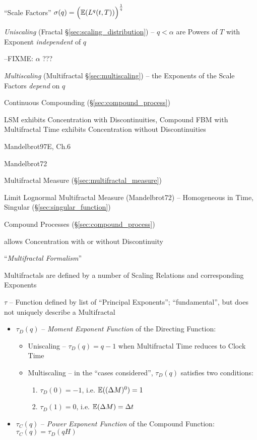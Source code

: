 ``Scale Factors'' $\sigma(q) = \Big(\mathbb{E}(L^q(t, T))\Big)^{\frac{1}{q}}$

\emph{Uniscaling} (Fractal \S\ref{sec:scaling_distribution}) -- $q < \alpha$ are
Powers of $T$ with Exponent \emph{independent} of $q$

--FIXME: $\alpha$ ???

\emph{Multiscaling} (Multifractal \S\ref{sec:multiscaling}) -- the Exponents of
the Scale Factors \emph{depend} on $q$

Continuous Compounding (\S\ref{sec:compound_process})

LSM exhibits Concentration with Discontinuities, Compound FBM with Multifractal
Time exhibits Concentration without Discontinuities

Mandelbrot97E, Ch.6

Mandelbrot72

Multifractal Measure (\S\ref{sec:multifractal_measure})

Limit Lognormal Multifractal Measure (Mandelbrot72) -- Homogeneous in Time,
Singular (\S\ref{sec:singular_function})

Compound Processes (\S\ref{sec:compound_process})

allows Concentration with or without Discontinuity

``\emph{Multifractal Formalism}''

Multifractals are defined by a number of Scaling Relations and corresponding
Exponents

$\tau$ -- Function defined by list of ``Principal Exponents''; ``fundamental'',
but does not uniquely describe a Multifractal

\begin{itemize}
  \item $\tau_D(q)$ -- \emph{Moment Exponent Function} of the Directing
    Function:
    \begin{itemize}
      \item Uniscaling -- $\tau_D(q) = q - 1$ when Multifractal Time reduces to
        Clock Time
      \item Multiscaling -- in the ``cases considered'', $\tau_D(q)$ satisfies
        two conditions:
        \begin{enumerate}
          \item $\tau_D(0) = -1$, i.e. $\mathbb{E}((\Delta M)^0) = 1$
          \item $\tau_D(1) = 0$, i.e. $\mathbb{E}(\Delta M) = \Delta t$
        \end{enumerate}
    \end{itemize}
  \item $\tau_C(q)$ -- \emph{Power Exponent Function} of the Compound Function:
    $\tau_C(q) = \tau_D(qH)$
\end{itemize}

